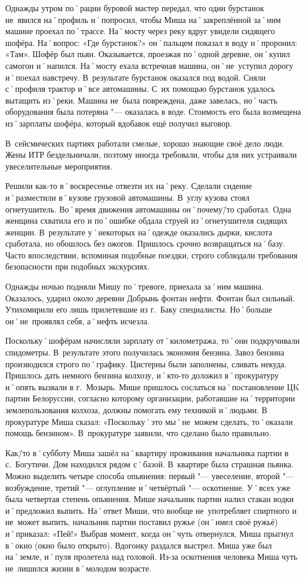 Однажды утром по˚рации буровой мастер передал, что один бурстанок не~явился на˚профиль и˚попросил, чтобы Миша на˚закреплённой за˚ним машине проехал по˚трассе. На˚мосту через реку вдруг увидели сидящего шофёра. На˚вопрос: «Где бурстанок?» он˚пальцем показал в воду и˚проронил: «Там». Шофёр был пьян. Оказывается, проезжая по˚одной деревне, он˚купил самогон и˚напился. На˚мосту ехала встречная машина, он˚не~уступил дорогу и˚поехал навстречу. В~результате бурстанок оказался под водой. Сняли с˚профиля трактор и˚все автомашины. С~их помощью бурстанок удалось вытащить из˚реки. Машина не~была повреждена, даже завелась, но˚часть оборудования была потеряна "--- оказалась в воде. Стоимость его была возмещена из˚зарплаты шофёра, который вдобавок ещё получил выговор. 

В~сейсмических партиях работали смелые, хорошо знающие своё дело люди. Жены ИТР бездельничали, поэтому иногда требовали, чтобы для них устраивали увеселительные мероприятия.

Решили как-то в˚воскресенье отвезти их на˚реку. Сделали сидение и˚разместили в˚кузове грузовой автомашины. В~углу кузова стоял огнетушитель. Во˚время движения автомашины он˚почему\=/то сработал. Одна женщина схватила его и по˚ошибке обдала струей из˚огнетушителя сидящих женщин. В~результате у˚некоторых на˚одежде оказались дырки, кислота сработала, но обошлось без ожогов. Пришлось срочно возвращаться на˚базу. Часто впоследствии, вспоминая подобные поездки, строго соблюдали требования безопасности при подобных экскурсиях.

Однажды ночью подняли Мишу по˚тревоге, приехала за˚ним машина. Оказалось, ударил около деревни Добрынь фонтан нефти. Фонтан был сильный. Утихомирили его лишь прилетевшие из г.~Баку специалисты. Но˚больше он˚не~проявлял себя, а˚нефть исчезла. 

Поскольку˚шофёрам начисляли зарплату от˚километража, то˚они подкручивали спидометры. В~результате этого получилась экономия бензина. Завоз бензина производился строго по˚графику. Цистерны были заполнены, сливать некуда. Пришлось дать немного бензина колхозу, и˚кто-то доложил в˚прокуратуру и˚опять вызвали в г.~Мозырь. Мише пришлось сослаться на˚постановление ЦK партии Белоруссии, согласно которому организации, работавшие на˚территории землепользования колхоза, должны помогать ему техникой и˚людьми. В прокуратуре Миша сказал: «Поскольку˚это мы˚не~можем сделать, то˚оказали помощь бензином». В~прокуратуре заявили, что сделано было правильно.

Как\=/то в˚субботу Миша зашёл на˚квартиру проживания начальника партии в с.~Богутичи. Дом находился рядом с˚базой. В~квартире была страшная пьянка. Можно выделить четыре способа опьянения: первый "--- увеселение, второй "--- возбуждение, третий "--- оглупление и˚четвёртый "--- оскотнение. У˚всех уже была четвертая степень опьянения. Мише начальник партии налил стакан водки и˚предложил выпить. На˚ответ Миши, что вообще не~употребляет спиртного и не~может выпить, начальник партии поставил ружье (он˚имел своё ружьё) и˚приказал: «Пей!» Выбрав момент, когда он˚чуть отвернулся, Миша прыгнул в˚окно (окно было открыто). Вдогонку раздался выстрел. Миша уже был на˚земле, и˚пуля пролетела над головой. Из-за оскотнения человека Миша чуть не~лишился жизни в˚молодом возрасте.


